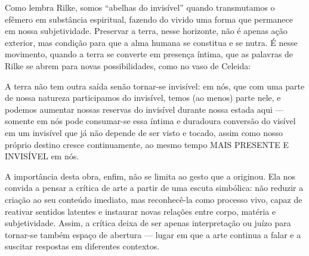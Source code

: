 Como lembra Rilke, somos “abelhas do invisível” quando transmutamos o efêmero em substância espiritual, fazendo do vivido uma forma que permanece em nossa subjetividade. Preservar a terra, nesse horizonte, não é apenas ação exterior, mas condição para que a alma humana se constitua e se nutra. É nesse movimento, quando a terra se converte em presença íntima, que as palavras de Rilke se abrem para novas possibilidades, como no vaso de Celeida:

\begin{citacao}
  A terra não tem outra saída senão tornar-se invisível: em nós, que com uma parte de nossa natureza participamos do invisível, temos (ao menos) parte nele, e podemos aumentar nossas reservas do invisível durante nossa estada aqui — somente em nós pode consumar-se essa íntima e duradoura conversão do visível em um invisível que já não depende de ser visto e tocado, assim como nosso próprio destino cresce continuamente, ao mesmo tempo MAIS PRESENTE E INVISÍVEL em nós. \parencite[p.445]{rilkeLetterWitoldHulewicz1972}
\end{citacao}

A importância desta obra, enfim, não se limita ao gesto que a originou. Ela nos convida a pensar a crítica de arte a partir de uma escuta simbólica: não reduzir a criação ao seu conteúdo imediato, mas reconhecê-la como processo vivo, capaz de reativar sentidos latentes e instaurar novas relações entre corpo, matéria e subjetividade. Assim, a crítica deixa de ser apenas interpretação ou juízo para tornar-se também espaço de abertura — lugar em que a arte continua a falar e a suscitar respostas em diferentes contextos.
